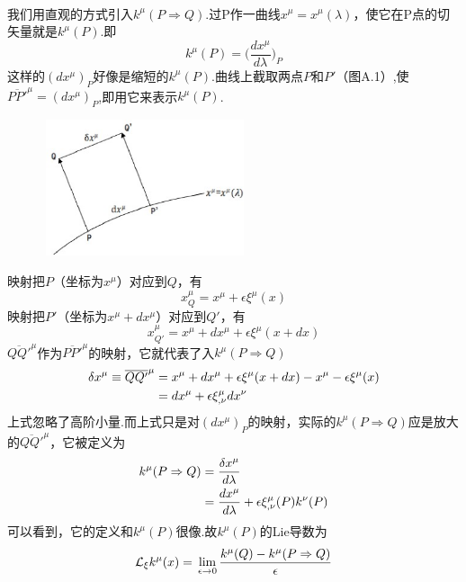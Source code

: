\documentclass[a4paper]{book}
\begin{document}
\begin{appendix}
\begin{align}
\end{align}
\par
我们用直观的方式引入$k^{\mu}(P\Rightarrow Q)$.过P作一曲线$x^{\mu}=x^\mu(\lambda)$，使它在P点的切矢量就是$k^{\mu}(P)$.即
\begin{equation}
	k^{\mu}(P)=\Big(\frac{dx^\mu}{d\lambda}\Big)_P
\end{equation}
这样的$(dx^\mu)_P$好像是缩短的$k^\mu(P)$.曲线上截取两点$P$和$P'$（图A.1）,使$\overline{PP'}^\mu=(dx^\mu)_P$,即用它来表示$k^\mu(P)$.
\begin{figure}[!h]
	\centering
	\includegraphics[width=6cm,height=4cm]{figures/李.eps}
	\caption{}
\end{figure} 
映射把$P$（坐标为$x^\mu$）对应到$Q$，有
\begin{equation}
	x^{\mu}_{Q}=x^\mu+\epsilon\xi^\mu(x)
\end{equation}
映射把$P'$（坐标为$x^\mu+dx^\mu$）对应到$Q'$，有
\begin{equation}
	x^{\mu}_{Q'}=x^\mu+dx^\mu+\epsilon\xi^\mu(x+dx)
\end{equation}
$\overline{QQ'}^\mu$作为$\overline{PP'}^\mu$的映射，它就代表了入$k^{\mu}(P\Rightarrow Q)$
\begin{align}\label{A.47}
	\delta x^\mu\equiv\overline{QQ'}^\mu={}&x^\mu+dx^\mu+\epsilon\xi^\mu(x+dx)-x^\mu-\epsilon\xi^\mu(x)\notag \\={}& dx^\mu+\epsilon \xi^{\mu}_{,\nu}dx^{\nu}
\end{align}
上式忽略了高阶小量.而上式只是对$(dx^\mu)_P$的映射，实际的$k^{\mu}(P\Rightarrow Q)$应是放大的$\overline{QQ'}^\mu$，它被定义为
\begin{align}
	k^{\mu}(P\Rightarrow Q)={}&\frac{\delta x^\mu}{d\lambda}\notag \\={}&\frac{dx^\mu}{d\lambda}+\epsilon\xi^{\mu}_{,\nu}(P)k^\nu(P)
\end{align}
可以看到，它的定义和$k^\mu(P)$很像.故$k^\mu(P)$的Lie导数为
\begin{align}\label{A.49}
		\mathcal{L_{\xi}}k^\mu(x)={}& \lim_{\epsilon\rightarrow 0}\frac{k^\mu(Q)-k^{\mu}(P\Rightarrow Q)}{\epsilon}\notag \\

\end{align}
\end{appendix}
\end{document}
